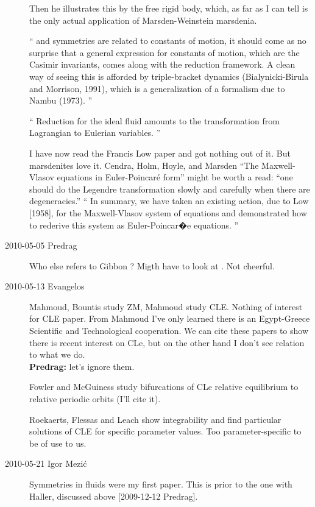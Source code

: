 \begin{description}
Then he illustrates this by the free rigid body, which, as far as I can
tell is the only actual application of Marsden-Weinstein marsdenia.

``
and symmetries are related to constants of motion, it
should come as no surprise that a general expression for
constants of motion, which are the Casimir invariants,
comes along with the reduction framework. A clean way
of seeing this is afforded by triple-bracket dynamics
(Bialynicki-Birula and Morrison, 1991), which is a generalization
of a formalism due to Nambu (1973).
''

``
Reduction for the ideal fluid
amounts to the transformation from Lagrangian to Eulerian
variables.
''

I have now read the  Francis Low paper and got nothing out
of it. But marsdenites love it.
Cendra, Holm, Hoyle, and Marsden
``The {Maxwell-Vlasov} equations in {Euler-Poincar\'e} form'' might
be worth a read:
``one should do the Legendre transformation slowly and
carefully when there are degeneracies.''
``
In summary, we have taken an existing action, due to Low [1958], for the
Maxwell-Vlasov system of equations and demonstrated how to rederive this system
as Euler-Poincar�e equations.
''




\item[2010-05-05  Predrag]
Who else refers to Gibbon
\etal{}?
Migth have to look at
.
Not cheerful.

\item[2010-05-13  Evangelos]

Mahmoud, Bountis \etal{} study ZM, Mahmoud
\etal{} study CLE. Nothing of interest for CLE paper. From
Mahmoud \etal{} I've only learned there is an Egypt-Greece
Scientific and Technological cooperation. We can cite these papers to
show there is recent interest on CLe, but on the other hand I don't see
relation to what we do.
\\
{\bf Predrag:} let's ignore them.

Fowler and McGuiness study bifurcations of CLe relative equilibrium
to relative periodic orbits (I'll cite it).

 Roekaerts, Flessas and Leach show integrability
and find particular solutions of CLE for specific parameter values.
Too parameter-specific to be of use to us.

\item[2010-05-21 Igor Mezi\'c]
Symmetries in fluids were my first paper.
This is prior to the one with Haller, discussed
 above [2009-12-12 Predrag].


\end{description}
